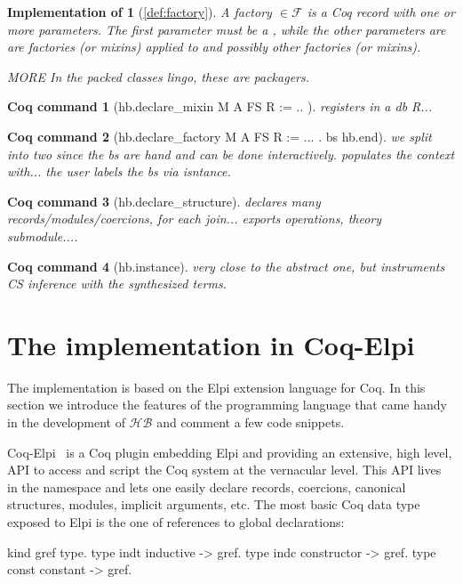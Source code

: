 \documentclass[a4paper,UKenglish,cleveref, autoref]{lipics-v2019}
\newcommand{\HB}{\ensuremath{\mathcal{HB}}}
\newcommand{\mixins}{mixins}
\newcommand{\factory}{factory}
\newcommand{\factories}{factories}
\newcommand{\packager}{packager}
\newcommand{\F}{\ensuremath{\mathcal{F}}}
\theoremstyle{implem}
\newtheorem*{implementation}{Implementation of}
\theoremstyle{implem}
\theoremstyle{axiom}
\theoremstyle{abscommand}
\theoremstyle{command}
\newtheorem*{command}{Coq command}
\begin{document}
\begin{implementation}[\autoref{def:factory}]
A \factory{}  \(\in \F{}\) is a Coq record with one or more parameters.
The first parameter must be a , while the other parameters are
are \factories{} (or \mixins) applied to  and possibly other
\factories{} (or \mixins).

MORE
In the packed classes lingo, these are \packager{}s.
\end{implementation}

\begin{command}[hb.declare_mixin M A FS R := { .. } ]
registers in a db R...
\end{command}
\begin{command}[hb.declare_factory M A FS R := {... }. bs hb.end]
we split into two since the bs are hand and can be done interactively.
populates the context with...
the user labels the bs via isntance.
\end{command}
\begin{command}[hb.declare_structure]
declares many records/modules/coercions, for each join... exports operations,
theory submodule....
\end{command}
\begin{command}[hb.instance]
very close to the abstract one, but instruments CS inference with
the synthesized terms.
\end{command}


\section{The implementation in Coq-Elpi}\label{sec:implementation}

The implementation is based on the Elpi
extension language for Coq. In this section we introduce the features of the
programming language that came handy in the development of \HB{} and
comment a few code snippets.

Coq-Elpi~\cite{CoqElpi} is a Coq plugin embedding
Elpi and providing an
extensive, high level, API to access and script the Coq system at the
vernacular level.
This API lives in the  namespace and lets one easily declare
records, coercions, canonical structures, modules, implicit arguments, etc.
The most basic Coq data type exposed to Elpi is the one of references to global
declarations:

\begin{elpicode}
kind gref  type.                 %
type indt  inductive -> gref.    %
type indc  constructor -> gref.  %
type const constant -> gref.     %
\end{elpicode}
\end{document}
